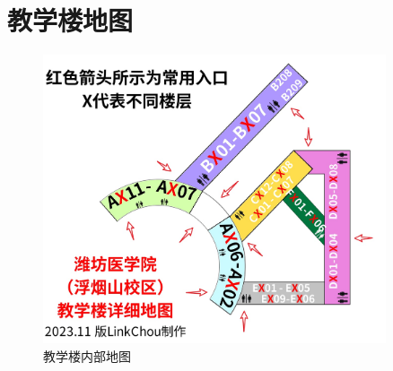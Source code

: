 \section[教学楼地图]{教学楼地图}
\begin{figure}[ht]
    \centering
    \includegraphics*[width=0.9\textwidth]{教学楼_updated.jpg}
    \caption[map_teach]{教学楼内部地图}
    \label{map_t}
\end{figure}


